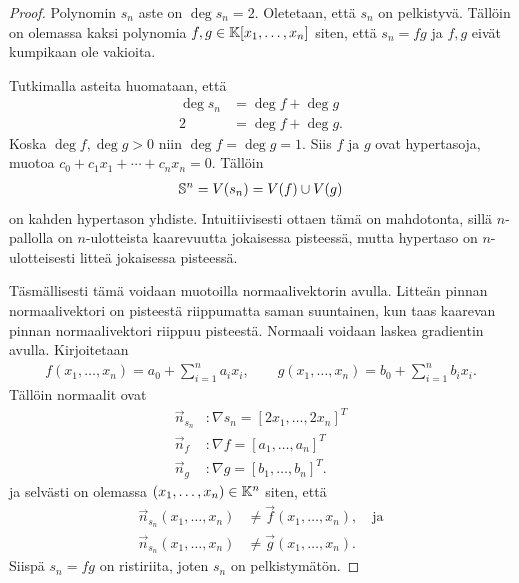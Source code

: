 \begin{proof}
    Polynomin $s_n$ aste on $\deg s_n=2$. Oletetaan, että $s_n$ on pelkistyvä. Tällöin on olemassa kaksi polynomia $f,g\in\K[x_1,\dots,x_n]$ siten, että $s_n=fg$ ja $f,g$ eivät kumpikaan ole vakioita.

    Tutkimalla asteita huomataan, että 
    \begin{align*}
        \deg s_n&=\deg f+\deg g \\
        2&=\deg f+\deg g.
    \end{align*}
    Koska $\deg f,\deg g>0$ niin $\deg f=\deg g=1$. Siis $f$ ja $g$ ovat hypertasoja, muotoa $c_0+c_1x_1+\cdots+c_nx_n=0$. Tällöin
    \begin{align*}
        \S^n=V(s_n)=V(f)\cup V(g)
    \end{align*}
    on kahden hypertason yhdiste. Intuitiivisesti ottaen tämä on mahdotonta, sillä $n$-pallolla on $n$-ulotteista kaarevuutta jokaisessa pisteessä, mutta hypertaso on $n$-ulotteisesti litteä jokaisessa pisteessä. 

    Täsmällisesti tämä voidaan muotoilla normaalivektorin avulla. Litteän pinnan normaalivektori on pisteestä riippumatta saman suuntainen, kun taas kaarevan pinnan normaalivektori riippuu pisteestä. Normaali voidaan laskea gradientin avulla. Kirjoitetaan
    \begin{align*}
        f(x_1,\dots,x_n)=a_0+\sum_{i=1}^{n}a_ix_i,\qquad
        g(x_1,\dots,x_n)=b_0+\sum_{i=1}^{n}b_ix_i.
    \end{align*}
    Tällöin normaalit ovat
    \begin{align*}
        \vec n_{s_n}&:\nabla s_n=\left[2x_1,\dots,2x_n\right]^T \\
        \vec n_f&:\nabla f=\left[a_1,\dots,a_n\right]^T \\
        \vec n_g&:\nabla g=\left[b_1,\dots,b_n\right]^T.
    \end{align*}
    ja selvästi on olemassa $(x_1,\dots,x_n)\in\K^n$ siten, että 
    \begin{align*}
        \vec n_{s_n}(x_1,\dots,x_n)&\ne\vec f(x_1,\dots,x_n),\quad\text{ja} \\
        \vec n_{s_n}(x_1,\dots,x_n)&\ne\vec g(x_1,\dots,x_n).
    \end{align*}
    Siispä $s_n=fg$ on ristiriita, joten $s_n$ on pelkistymätön.
\end{proof}


